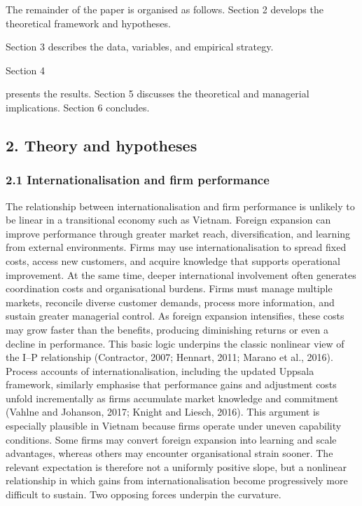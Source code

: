 \documentclass[12pt,a4paper]{article}
\begin{document}
The remainder of the paper is organised as follows. Section 2 develops
the theoretical framework and hypotheses.

Section 3 describes the data, variables, and empirical strategy.

Section 4

presents the results. Section 5 discusses the theoretical and managerial
implications. Section 6 concludes.

\hypertarget{2-theory-and-hypotheses}{%
\subsection{2. Theory and hypotheses}\label{2-theory-and-hypotheses}}

\hypertarget{21-internationalisation-and-firm-performance}{%
\subsubsection{2.1 Internationalisation and firm
performance}\label{21-internationalisation-and-firm-performance}}

The relationship between internationalisation and firm performance is
unlikely to be linear in a transitional economy such as Vietnam. Foreign
expansion can improve performance through greater market reach,
diversification, and learning from external environments. Firms may use
internationalisation to spread fixed costs, access new customers, and
acquire knowledge that supports operational improvement. At the same
time, deeper international involvement often generates coordination
costs and organisational burdens. Firms must manage multiple markets,
reconcile diverse customer demands, process more information, and
sustain greater managerial control. As foreign expansion intensifies,
these costs may grow faster than the benefits, producing diminishing
returns or even a decline in performance. This basic logic underpins the
classic nonlinear view of the I--P relationship (Contractor, 2007;
Hennart, 2011; Marano et al., 2016). Process accounts of
internationalisation, including the updated Uppsala framework, similarly
emphasise that performance gains and adjustment costs unfold
incrementally as firms accumulate market knowledge and commitment
(Vahlne and Johanson, 2017; Knight and Liesch, 2016). This argument is
especially plausible in Vietnam because firms operate under uneven
capability conditions. Some firms may convert foreign expansion into
learning and scale advantages, whereas others may encounter
organisational strain sooner. The relevant expectation is therefore not
a uniformly positive slope, but a nonlinear relationship in which gains
from internationalisation become progressively more difficult to
sustain. Two opposing forces underpin the curvature.
\end{document}
